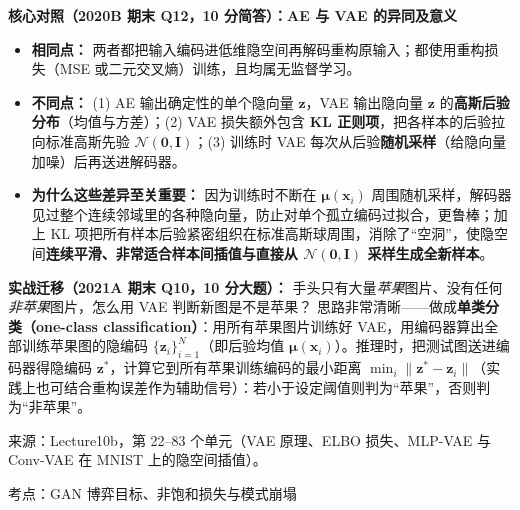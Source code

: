 \textbf{核心对照（2020B 期末 Q12，10 分简答）：AE 与 VAE 的异同及意义}
\begin{itemize}
\item \textbf{相同点：} 两者都把输入编码进低维隐空间再解码重构原输入；都使用重构损失（MSE 或二元交叉熵）训练，且均属无监督学习。
\item \textbf{不同点：} (1) AE 输出确定性的单个隐向量 $\mathbf{z}$，VAE 输出隐向量 $\mathbf{z}$ 的\textbf{高斯后验分布}（均值与方差）；(2) VAE 损失额外包含 \textbf{KL 正则项}，把各样本的后验拉向标准高斯先验 $\mathcal{N}(\mathbf{0},\mathbf{I})$；(3) 训练时 VAE 每次从后验\textbf{随机采样}（给隐向量加噪）后再送进解码器。
\item \textbf{为什么这些差异至关重要：} 因为训练时不断在 $\boldsymbol{\mu}(\mathbf{x}_i)$ 周围随机采样，解码器见过整个连续邻域里的各种隐向量，防止对单个孤立编码过拟合，更鲁棒；加上 KL 项把所有样本后验紧密组织在标准高斯球周围，消除了“空洞”，使隐空间\textbf{连续平滑、非常适合样本间插值与直接从 $\mathcal{N}(\mathbf{0},\mathbf{I})$ 采样生成全新样本}。
\end{itemize}

\textbf{实战迁移（2021A 期末 Q10，10 分大题）：} 手头只有大量\emph{苹果}图片、没有任何\emph{非苹果}图片，怎么用 VAE 判断新图是不是苹果？
思路非常清晰——做成\textbf{单类分类（one-class classification）}：用所有苹果图片训练好 VAE，用编码器算出全部训练苹果图的隐编码 $\{\mathbf{z}_i\}_{i=1}^N$（即后验均值 $\boldsymbol{\mu}(\mathbf{x}_i)$）。推理时，把测试图送进编码器得隐编码 $\mathbf{z}^*$，计算它到所有苹果训练编码的最小距离 $\min_i \|\mathbf{z}^*-\mathbf{z}_i\|$（实践上也可结合重构误差作为辅助信号）：若小于设定阈值则判为“苹果”，否则判为“非苹果”。


来源：Lecture10b，第 22–83 个单元（VAE 原理、ELBO 损失、MLP-VAE 与 Conv-VAE 在 MNIST 上的隐空间插值）。



考点：GAN 博弈目标、非饱和损失与模式崩塌 

